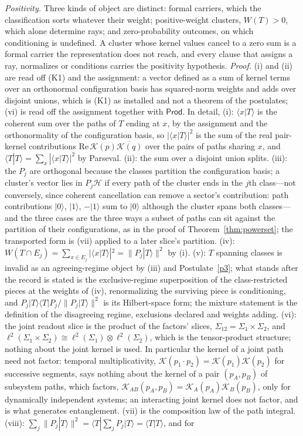 \noindent\emph{Positivity.} Three kinds of object are distinct: formal carriers, which the classification sorts whatever their weight; positive-weight clusters, $W(T) > 0$, which alone determine rays; and zero-probability outcomes, on which conditioning is undefined. A cluster whose kernel values cancel to a zero sum is a formal carrier the representation does not reach, and every clause that assigns a ray, normalizes or conditions carries the positivity hypothesis.
\noindent\textit{Proof.} (i) and (ii) are read off (K1) and the assignment: a vector defined as a sum of kernel terms over an orthonormal configuration basis has squared-norm weights and adds over disjoint unions, which is (K1) as installed and not a theorem of the postulates; (vi) is read off the assignment together with $\mathsf{Prod}$. In detail, (i): $\langle x|T\rangle$ is the coherent sum over the paths of $T$ ending at $x$, by the assignment and the orthonormality of the configuration basis, so $|\langle x|T\rangle|^2$ is the sum of the real pair-kernel contributions $\mathrm{Re}\,\mathcal{K}(p)\overline{\mathcal{K}(q)}$ over the pairs of paths sharing $x$, and $\langle T|T\rangle = \sum_x|\langle x|T\rangle|^2$ by Parseval. (ii): the sum over a disjoint union splits. (iii): the $P_j$ are orthogonal because the classes partition the configuration basis; a cluster's vector lies in $P_j\mathcal{H}$ if every path of the cluster ends in the $j$th class---not conversely, since coherent cancellation can remove a sector's contribution: path contributions $|0\rangle$, $|1\rangle$, $-|1\rangle$ sum to $|0\rangle$ although the cluster spans both classes--- and the three cases are the three ways a subset of paths can sit against the partition of their configurations, as in the proof of Theorem~\ref{thm:powerset}; the transported form is (vii) applied to a later slice's partition. (iv): $W(T \cap E_j) = \sum_{x \in E_j}|\langle x|T\rangle|^2 = \lVert P_j|T\rangle\rVert^2$ by (i). (v): $T$ spanning classes is invalid as an agreeing-regime object by (iii) and Postulate~\ref{p3}; what stands after the record is stated is the exclusive-regime superposition of the class-restricted pieces at the weights of (iv), renormalizing the surviving piece is conditioning, and $P_j|T\rangle\langle T|P_j/\lVert P_j|T\rangle\rVert^2$ is its Hilbert-space form; the mixture statement is the definition of the disagreeing regime, exclusions declared and weights adding. (vi): the joint readout slice is the product of the factors' slices, $\Sigma_{12} = \Sigma_1 \times \Sigma_2$, and $\ell^2(\Sigma_1 \times \Sigma_2) \cong \ell^2(\Sigma_1) \otimes \ell^2(\Sigma_2)$, which is the tensor-product structure; nothing about the joint kernel is used. In particular the kernel of a joint path need not factor: temporal multiplicativity, $\mathcal{K}(p_1 \cdot p_2) = \mathcal{K}(p_1)\mathcal{K}(p_2)$ for successive segments, says nothing about the kernel of a pair $(p_A, p_B)$ of subsystem paths, which factors, $\mathcal{K}_{AB}(p_A, p_B) = \mathcal{K}_A(p_A)\mathcal{K}_B(p_B)$, only for dynamically independent systems; an interacting joint kernel does not factor, and is what generates entanglement. (vii) is the composition law of the path integral. (viii): $\sum_j\lVert P_j|T\rangle\rVert^2 = \langle T|\sum_j P_j|T\rangle = \langle T|T\rangle$, and for 